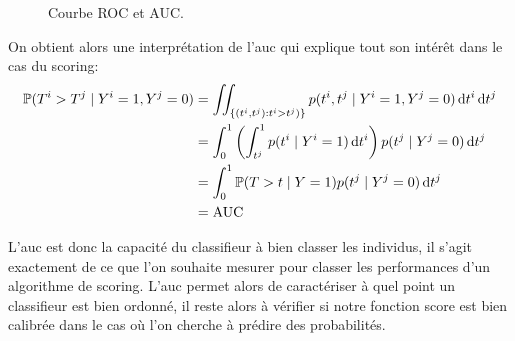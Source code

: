 \begin{figure}[htbp]
\centering
    \caption{Courbe ROC et AUC.}
\end{figure}

On obtient alors une interprétation de l'\ac{auc} qui explique tout son intérêt dans le cas du scoring:
\begin{align*}
    \mathbb{P} ( T^i > T^j \mid Y^i = 1 , Y^j = 0 ) &= \iint_{ \{ (t^i,t^j) : t^i > t^j) \} } p(t^i,t^j \mid Y^i = 1 , Y^j = 0 ) \mathop{}\!\mathrm{d} t^i \mathop{}\!\mathrm{d} t^j \\
    &= \int_0^1 \left( \int_{t^j}^1 p(t^i \mid Y^i = 1 ) \mathop{}\!\mathrm{d} t^i  \right) p(t^j \mid Y^j = 0 ) \mathop{}\!\mathrm{d} t^j \\
    &= \int_0^1 \mathbb{P} ( T > t \mid Y = 1 ) p(t^j \mid Y^j = 0 ) \mathop{}\!\mathrm{d} t^j \\
    &= \mathrm{AUC}
\end{align*}

L'\ac{auc} est donc la capacité du classifieur à bien classer les individus, il s'agit exactement de ce que l'on souhaite mesurer pour classer les performances d'un algorithme de scoring. L'\ac{auc} permet alors de caractériser à quel point un classifieur est bien ordonné, il reste alors à vérifier si notre fonction score est bien calibrée dans le cas où l'on cherche à prédire des probabilités.

